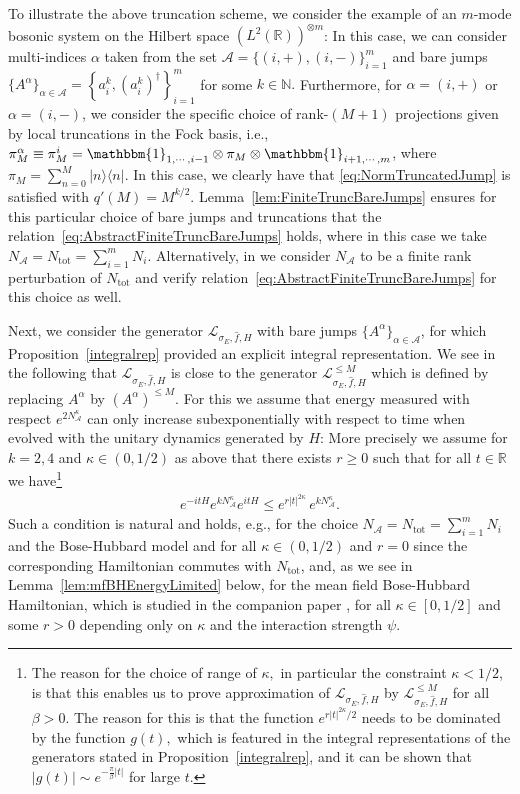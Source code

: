 \documentclass[11pt]{amsart}
\newcommand{\1}{\mathbbm{1}}
\newcommand{\kb}[1]{|#1\rangle\!\langle#1|}
\newcommand{\R}{\mathbb{R}}
\newcommand{\N}{\mathbb{N}}
\newcommand{\NA}{N_{\mathcal{A}}}
\newcommand{\cA}{\mathcal{A}}
\newcommand{\Ntot}{N_{\operatorname{tot}}}
\theoremstyle{plain}
\theoremstyle{definition}
\theoremstyle{remark}
\numberwithin{equation}{section}
\begin{document}
To illustrate the above truncation scheme, we consider the example of an $m$-mode bosonic system on the Hilbert space $\left(L^2(\R)\right)^{\otimes m}$: In this case, we can consider multi-indices $\alpha$ taken from the set $\cA=\{(i,+),(i,-)\}_{i=1}^m$ and bare jumps $\{A^\alpha\}_{\alpha\in \cA}=\left\{a^k_i,(a_i^k)^\dagger\right\}_{i=1}^m $ for some $k\in \N.$ Furthermore, for $\alpha= (i,+)$ or $\alpha=(i,-)$, we consider the specific choice of rank-$(M+1)$ projections given by local truncations in the Fock basis, i.e., $\pi^{\alpha}_M \equiv \pi^i_M = \1_{1,\cdots,i-1}\otimes \pi_M\otimes \1_{i+1,\cdots,m} $, where $\pi_M = \sum_{n=0}^{M} \kb{n}.$ 
 In this case, we clearly have that \eqref{eq:NormTruncatedJump} is satisfied with $q'(M) = M^{k/2}.$ 
Lemma~\ref{lem:FiniteTruncBareJumps} ensures for this particular choice of bare jumps and truncations that the relation~\eqref{eq:AbstractFiniteTruncBareJumps} holds, where in this case we take $\NA = \Ntot = \sum_{i=1}^m N_i.$ Alternatively, in \cite{BeckerRouzeSalzmannSchroedinger} we consider $\NA$ to be a finite rank perturbation of $\Ntot$ and verify relation~\eqref{eq:AbstractFiniteTruncBareJumps} for this choice as well. 


Next, we consider the generator $\mathcal{L}_{\sigma_E,\widehat{f},H}$ with bare jumps $\{A^{\alpha}\}_{\alpha\in\cA}$, for which Proposition~\ref{integralrep} provided an explicit integral representation. We see in the following that $\mathcal{L}_{\sigma_E,\widehat{f},H}$ is close to the generator $\mathcal{L}^{\le M}_{\sigma_E,\widehat{f},H}$ which is defined by replacing $A^\alpha$ by $\left(A^{\alpha}\right)^{\le M}.$  For this we assume that energy measured with respect $e^{2\NA^\kappa}$ can only increase subexponentially with respect to time when evolved with the unitary dynamics generated by $H$: More precisely we assume for $k=2,4$ and $\kappa\in(0,1/2)$ as above that there exists $r\ge 0$ such that for all $t\in\R$ we have\footnote{The reason for the choice of range of $\kappa,$ in particular the constraint $\kappa<1/2$, is that this enables us to prove approximation of $\mathcal{L}_{\sigma_E,\widehat{f},H}$ by $\mathcal{L}^{\le M}_{\sigma_E,\widehat{f},H}$ for all $\beta>0.$ The reason for this is that the function $e^{r|t|^{2\kappa}/2}$ needs to be dominated by the function $g(t),$ which is featured in the integral representations of the generators stated in Proposition~\ref{integralrep}, and it can be shown that $|g(t)|
\sim
e^{-\tfrac{\pi}{\beta}|t|}$ for large $t.$ }
\begin{align}\label{eq:ExpBound}
e^{-itH}e^{k\NA^\kappa} e^{itH}\le e^{r|t|^{2\kappa}}\,e^{k\NA^\kappa}.
\end{align}
Such a condition is natural and holds, e.g., for the choice $\NA=\Ntot = \sum_{i=1}^m N_i$ and the Bose-Hubbard model and for all $\kappa\in(0,1/2)$ and $r=0$ since the corresponding Hamiltonian commutes with $\Ntot$, and, as we see in Lemma~\ref{lem:mfBHEnergyLimited} below, for the mean field Bose-Hubbard Hamiltonian, which is studied in the companion paper \cite{BeckerRouzeSalzmannBose}, for all $\kappa\in[0,1/2]$ and some $r>0$ depending only on $\kappa$ and the interaction strength $\psi.$ 
\end{document}

